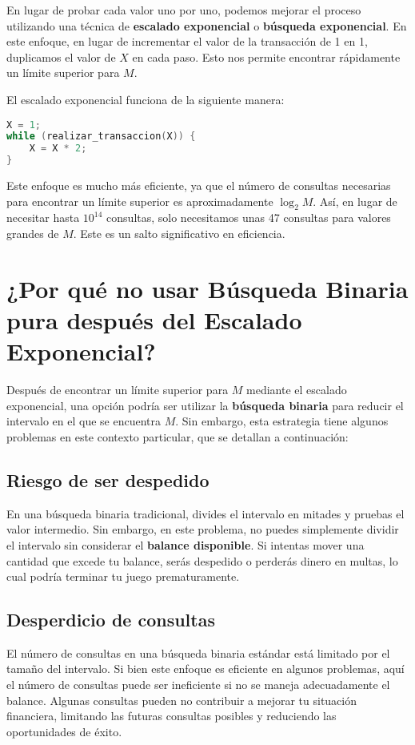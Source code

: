 \documentclass{article}
\begin{document}
En lugar de probar cada valor uno por uno, podemos mejorar el proceso utilizando una técnica de \textbf{escalado exponencial} o \textbf{búsqueda exponencial}. En este enfoque, en lugar de incrementar el valor de la transacción de 1 en 1, duplicamos el valor de $X$ en cada paso. Esto nos permite encontrar rápidamente un límite superior para $M$.

El escalado exponencial funciona de la siguiente manera:

\begin{lstlisting}[language=C]
X = 1;
while (realizar_transaccion(X)) {
    X = X * 2;
}
\end{lstlisting}

Este enfoque es mucho más eficiente, ya que el número de consultas necesarias para encontrar un límite superior es aproximadamente $\log_2 M$. Así, en lugar de necesitar hasta $10^{14}$ consultas, solo necesitamos unas 47 consultas para valores grandes de $M$. Este es un salto significativo en eficiencia.

\section{¿Por qué no usar Búsqueda Binaria pura después del Escalado Exponencial?}

Después de encontrar un límite superior para $M$ mediante el escalado exponencial, una opción podría ser utilizar la \textbf{búsqueda binaria} para reducir el intervalo en el que se encuentra $M$. Sin embargo, esta estrategia tiene algunos problemas en este contexto particular, que se detallan a continuación:

\subsection{ Riesgo de ser despedido}
En una búsqueda binaria tradicional, divides el intervalo en mitades y pruebas el valor intermedio. Sin embargo, en este problema, no puedes simplemente dividir el intervalo sin considerar el \textbf{balance disponible}. Si intentas mover una cantidad que excede tu balance, serás despedido o perderás dinero en multas, lo cual podría terminar tu juego prematuramente.

\subsection{Desperdicio de consultas}
El número de consultas en una búsqueda binaria estándar está limitado por el tamaño del intervalo. Si bien este enfoque es eficiente en algunos problemas, aquí el número de consultas puede ser ineficiente si no se maneja adecuadamente el balance. Algunas consultas pueden no contribuir a mejorar tu situación financiera, limitando las futuras consultas posibles y reduciendo las oportunidades de éxito.
\end{document}
